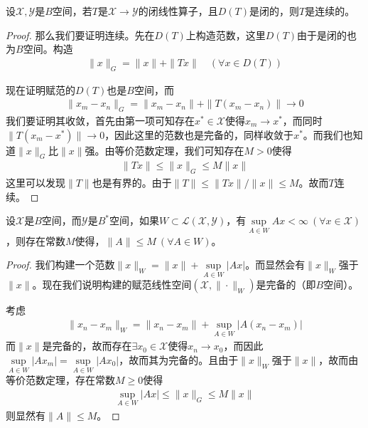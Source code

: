\begin{theorem}[闭图像定理]
    设$\mathscr{X},\mathscr{Y}$是$B$空间，若$T$是$\mathscr{X}\to\mathscr{Y}$的闭线性算子，且$D(T)$是闭的，则$T$是连续的。
\end{theorem}
\begin{proof}
    那么我们要证明连续。先在$D(T)$上构造范数，这里$D(T)$由于是闭的也为$B$空间。构造
    \begin{align*}
        \|x\|_G = \|x\| + \|Tx\|\quad (\forall x\in D(T))
    \end{align*}

    现在证明赋范的$D(T)$也是$B$空间，而
    \begin{align*}
        \|x_m - x_n\|_G = \|x_m - x_n\| + \|T(x_m - x_n)\| \to 0
    \end{align*}
    我们要证明其收敛，首先由第一项可知存在$x^*\in\mathscr{X}$使得$x_m\to x^*$，而同时$\|T(x_m - x^*)\|\to 0$，因此这里的范数也是完备的，同样收敛于$x^*$。而我们也知道$\|x\|_G$比$\|x\|$强。由等价范数定理，我们可知存在$M > 0$使得
    \begin{align*}
        \|Tx\| \leqslant \|x\|_G \leqslant M\|x\|
    \end{align*}
    这里可以发现$\|T\|$也是有界的。由于$\|T\|\leqslant \|Tx\| / \|x\| \leqslant M$。故而$T$连续。
\end{proof}

\begin{theorem}[共鸣定理或一致有界定理]
    设$\mathscr{X}$是$B$空间，而$\mathscr{Y}$是$B^*$空间，如果$W\subset\mathscr{L}(\mathscr{X},\mathscr{Y})$，有$\sup\limits_{A\in W} Ax < \infty\ (\forall x\in\mathscr{X})$，则存在常数$M$使得，$\|A\|\leqslant M\ (\forall A\in W)$。
\end{theorem}
\begin{proof}
    我们构建一个范数$\|x\|_W = \|x\| + \sup\limits_{A\in W} |Ax|$。而显然会有$\|x\|_W$强于$\|x\|$。现在我们说明构建的赋范线性空间$(\mathscr{X},\|\cdot\|_W)$是完备的（即$B$空间）。
    
    考虑
    \begin{align*}
        \|x_n - x_m\|_W = \|x_n - x_m\| + \sup\limits_{A\in W} |A(x_n - x_m)|
    \end{align*}
    而$\|x\|$是完备的，故而存在$\exists x_0\in\mathscr{X}$使得$x_n\to x_0$，而因此$\sup\limits_{A\in W} |Ax_m| = \sup\limits_{A\in W} |Ax_0|$，故而其为完备的。且由于$\|x\|_W$强于$\|x\|$，故而由等价范数定理，存在常数$M\geqslant 0$使得
    \begin{align*}
        \sup\limits_{A\in W} |Ax| \leqslant \|x\|_G \leqslant M\|x\|
    \end{align*}
    则显然有$\|A\|\leqslant M$。
\end{proof}

